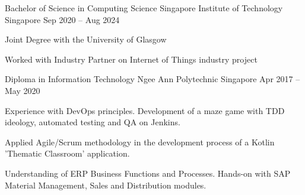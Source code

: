 

\begin{cventries}

  \cventry
  {Bachelor of Science in Computing Science} %
  {Singapore Institute of Technology} %
  {Singapore} %
  {Sep 2020 – Aug 2024} %
  {
    \begin{cvitems} %
      \item {Joint Degree with the University of Glasgow}
      \item {Worked with Industry Partner on Internet of Things industry project}\vspace{5mm}
    \end{cvitems}
  }

  \cventry
  {Diploma in Information Technology} %
  {Ngee Ann Polytechnic} %
  {Singapore} %
  {Apr 2017 – May 2020} %
  {
    \begin{cvitems} %
      \item {Experience with DevOps principles. Development of a maze game with TDD ideology, automated testing and QA on Jenkins.}
      \item {Applied Agile/Scrum methodology in the development process of a Kotlin 'Thematic Classroom' application.}
      \item {Understanding of ERP Business Functions and Processes. Hands-on with SAP Material Management, Sales and Distribution modules.}\vspace{5mm}
    \end{cvitems}
  }

\end{cventries}